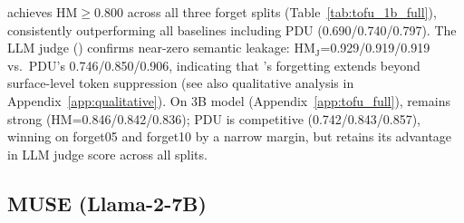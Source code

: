 \method achieves HM$\geq$0.800 across all three forget splits (Table~\ref{tab:tofu_1b_full}), consistently outperforming all baselines including PDU (0.690/0.740/0.797).
The LLM judge () confirms near-zero semantic leakage: HM$_\text{J}$=0.929/0.919/0.919 vs.\ PDU's 0.746/0.850/0.906, indicating that \method's forgetting extends beyond surface-level token suppression (see also qualitative analysis in Appendix~\ref{app:qualitative}).
On 3B model (Appendix~\ref{app:tofu_full}), \method remains strong (HM=0.846/0.842/0.836); PDU is competitive (0.742/0.843/0.857), winning on forget05 and forget10 by a narrow margin, but \method retains its advantage in LLM judge score across all splits.

\subsection{MUSE (Llama-2-7B)}
\label{sec:muse}


